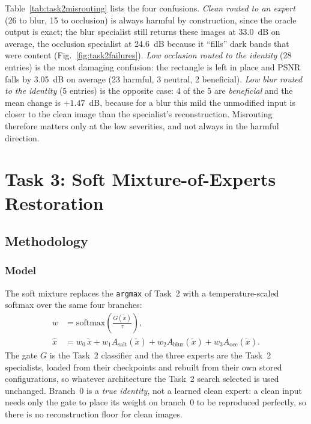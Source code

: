 \documentclass[conference]{IEEEtran}
\begin{document}
Table~\ref{tab:task2misrouting} lists the four confusions. \emph{Clean routed to
an expert} (26 to blur, 15 to occlusion) is always harmful by construction, since
the oracle output is exact; the blur specialist still returns these images at
33.0~dB on average, the occlusion specialist at 24.6~dB because it ``fills'' dark
bands that were content (Fig.~\ref{fig:task2failures}). \emph{Low occlusion routed
to the identity} (28 entries) is the most damaging confusion: the rectangle is
left in place and PSNR falls by 3.05~dB on average (23 harmful, 3 neutral, 2
beneficial). \emph{Low blur routed to the identity} (5 entries) is the opposite
case: 4 of the 5 are \emph{beneficial} and the mean change is $+1.47$~dB, because
for a blur this mild the unmodified input is closer to the clean image than the
specialist's reconstruction. Misrouting therefore matters only at the low
severities, and not always in the harmful direction.

\section{Task 3: Soft Mixture-of-Experts Restoration}
\label{sec:task3}

\subsection{Methodology}

\subsubsection{Model}

The soft mixture replaces the \texttt{argmax} of Task~2 with a temperature-scaled
softmax over the same four branches:
\begin{align}
  w &= \mathrm{softmax}\!\left(\frac{G(\tilde{x})}{\tau}\right), \label{eq:gate}\\
  \hat{x} &= w_0\,\tilde{x} + w_1 A_\text{salt}(\tilde{x}) + w_2 A_\text{blur}(\tilde{x}) + w_3 A_\text{occ}(\tilde{x}).
  \label{eq:moe}
\end{align}
The gate $G$ is the Task~2 classifier and the three experts are the Task~2
specialists, loaded from their checkpoints and rebuilt from their own stored
configurations, so whatever architecture the Task~2 search selected is used
unchanged. Branch~0 is a \emph{true identity}, not a learned clean expert: a
clean input needs only the gate to place its weight on branch~0 to be reproduced
perfectly, so there is no reconstruction floor for clean images.
\end{document}
